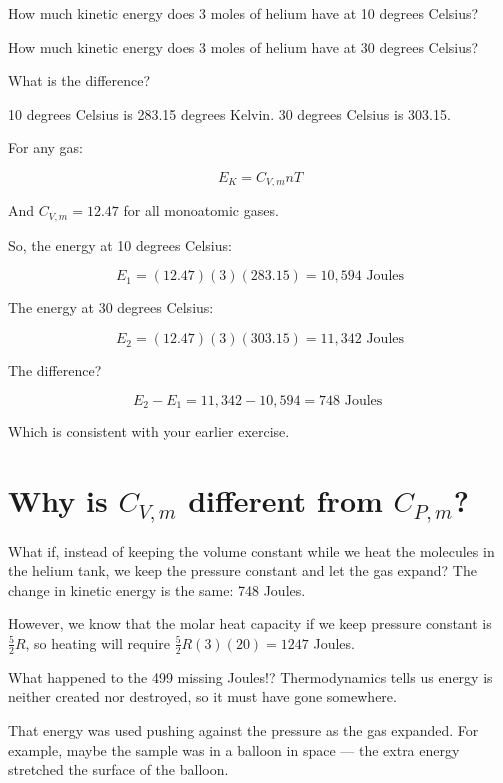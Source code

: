 \begin{Exercise}[title={Warming Helium Revisited}, label=warming_helium2]

How much kinetic energy does 3 moles of helium have at 10 degrees Celsius?

How much kinetic energy does 3 moles of helium have at 30 degrees Celsius?

What is the difference?

\end{Exercise}
\begin{Answer}[ref=warming_helium2]

10 degrees Celsius is 283.15 degrees Kelvin. 30 degrees Celsius is 303.15.

For any gas:

$$E_K =C_{V,m} n T$$

And $C_{V,m} = 12.47$ for all monoatomic gases.

So, the energy at 10 degrees Celsius:

$$E_1 = (12.47)(3)(283.15) = 10,594 \text{ Joules}$$

The energy at 30 degrees Celsius:

$$E_2 = (12. 47)(3)(303.15) = 11,342 \text{ Joules}$$

The difference?

$$E_2 - E_1 = 11,342 - 10,594  = 748 \text{ Joules }$$

Which is consistent with your earlier exercise.

\end{Answer}

\section{Why is $C_{V,m}$ different from $C_{P,m}$?}

What if, instead of keeping the volume constant while we heat the molecules in the helium tank, we keep the pressure constant and let the gas expand? 
The change in kinetic energy is the same: 748 Joules.

However, we know that the molar heat capacity if we keep pressure constant is $\frac{5}{2}R$, so heating will require $\frac{5}{2}R(3)(20) = 1247$ Joules. 

What happened to the 499 missing Joules!? Thermodynamics tells us energy is neither created nor destroyed, so it must have gone somewhere.

That energy was used pushing against the pressure as the gas expanded. For example, maybe the sample was in a balloon in space --- the extra energy stretched the surface of the balloon. 

